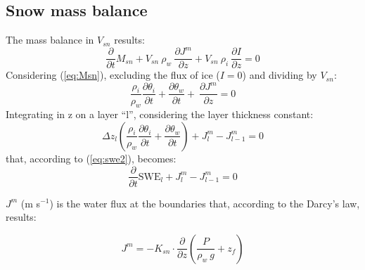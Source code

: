 \subsection{Snow mass balance}
The mass balance in $V_{sn}$ results:
\begin{equation}\label{eq:wb0}
\frac{\partial}{\partial t} M_{sn} + V_{sn} \ \rho_w \ \frac{\partial J^m}{\partial z} + V_{sn} \ \rho_i \ \frac{\partial I}{\partial z}=0
\end{equation}
Considering (\ref{eq:Msn}), excluding the flux of ice ($I=0$) and dividing by $V_{sn}$:
\begin{equation}\label{eq:wb1}
\frac{\rho_i}{\rho_w} \frac{\partial \theta_i}{\partial t} + \frac{\partial \theta_w}{\partial t}+ \ \frac{\partial J^m}{\partial z} =0
\end{equation}
%
%
Integrating in z on a layer ``l'', considering the layer thickness constant:
\begin{equation}\label{}
\Delta z_l \left(\frac{\rho_i}{\rho_w} \frac{\partial \theta_i}{\partial t} + \frac{\partial \theta_w}{\partial t} \right)+ J_l^m -J_{l-1}^m =0
\end{equation}
%
that, according to (\ref{eq:swe2}), becomes:
\begin{equation}\label{}
\frac{\partial}{\partial t}\textrm{SWE}_l+ J_l^m -J_{l-1}^m =0
\end{equation}

\noindent $J^m$ (m s$^{-1}$) is the water flux at the boundaries that, according to the Darcy's law, results:

\begin{equation}
J^m =-K_{sn} \cdot \frac{\partial}{\partial z} \left(\frac{P}{\rho_w \ g} + z_f \right)
\end{equation}

